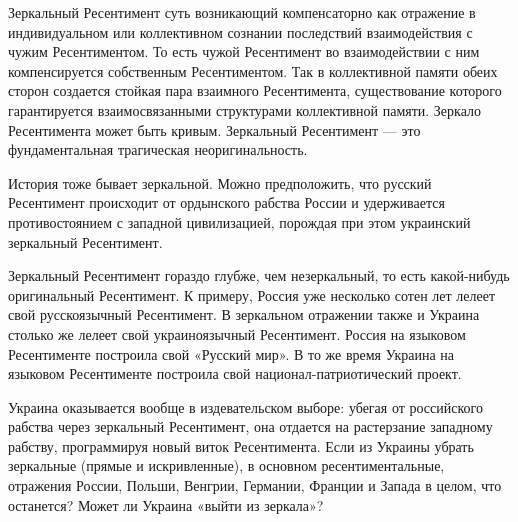 Зеркальный Ресентимент суть возникающий компенсаторно как отражение в
индивидуальном или коллективном сознании последствий взаимодействия с чужим
Ресентиментом. То есть чужой Ресентимент во взаимодействии с ним компенсируется
собственным Ресентиментом. Так в коллективной памяти обеих сторон создается
стойкая пара взаимного Ресентимента, существование которого гарантируется
взаимосвязанными структурами коллективной памяти. Зеркало Ресентимента может
быть кривым. Зеркальный Ресентимент — это фундаментальная трагическая
неоригинальность.

История тоже бывает зеркальной. Можно предположить, что русский Ресентимент
происходит от ордынского рабства России и удерживается противостоянием с
западной цивилизацией, порождая при этом украинский зеркальный Ресентимент.

Зеркальный Ресентимент гораздо глубже, чем незеркальный, то есть какой-нибудь
оригинальный Ресентимент. К примеру, Россия уже несколько сотен лет лелеет свой
русскоязычный Ресентимент. В зеркальном отражении также и Украина столько же
лелеет свой украиноязычный Ресентимент. Россия на языковом Ресентименте
построила свой «Русский мир». В то же время Украина на языковом Ресентименте
построила свой национал-патриотический проект.

Украина оказывается вообще в издевательском выборе: убегая от российского
рабства через зеркальный Ресентимент, она отдается на растерзание западному
рабству, программируя новый виток Ресентимента. Если из Украины убрать
зеркальные (прямые и искривленные), в основном ресентиментальные, отражения
России, Польши, Венгрии, Германии, Франции и Запада в целом, что останется?
Может ли Украина «выйти из зеркала»?
